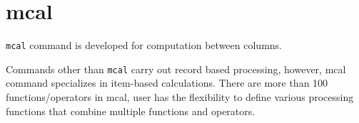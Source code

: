 \documentclass[a4paper]{book}
\begin{document}
\chapter{mcal}
\verb|mcal| command is developed for computation between columns. 

Commands other than \verb|mcal| carry out record based processing,  however, mcal command specializes in item-based calculations.  There are more than 100 functions/operators in mcal, user has the flexibility to define various processing functions that combine multiple functions and operators. 























 















































\end{document}
